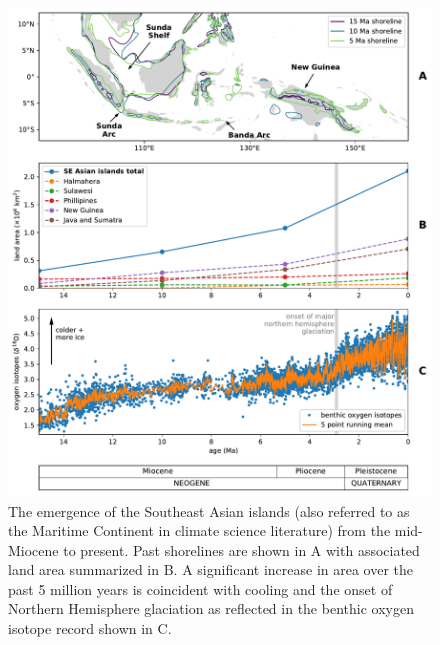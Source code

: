 \documentclass[9pt,twocolumn,twoside,lineno]{pnas-new}
\begin{document}
\begin{figure}
    \centering
    \includegraphics[width=0.9\linewidth]{Figures/shoreline_growth.pdf}
    \caption{The emergence of the Southeast Asian islands (also referred to as the Maritime Continent in climate science literature) from the mid-Miocene to present. Past shorelines are shown in A with associated land area summarized in B. A significant increase in area over the past 5 million years is coincident with cooling and the onset of Northern Hemisphere glaciation as reflected in the benthic oxygen isotope record \cite{Zachos2008a} shown in C.}
    \label{fig:shoreline_growth}
\end{figure}
\end{document}
